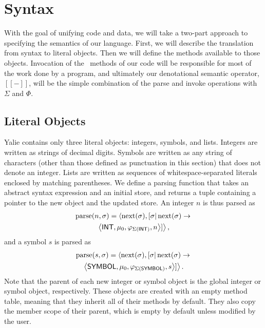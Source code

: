 \documentclass[twocolumn]{article}
\begin{document}
\section*{Syntax}

With the goal of unifying code and data, we will take a two-part
approach to specifying the semantics of our language. First, we will
describe the translation from syntax to literal objects. Then we will
define the methods available to those objects. Invocation of the
\eval\ methods of our code will be responsible for most of the work
done by a program, and ultimately our denotational semantic operator,
$[\![-]\!]$, will be the simple combination of the parse and invoke
operations with $\Sigma$ and $\Phi$.

\subsection*{Literal Objects}
Yalie contains only three literal objects: integers, symbols, and
lists. Integers are written as strings of decimal digits. Symbols are
written as any string of characters (other than those defined as
punctuation in this section) that does not denote an integer. Lists
are written as sequences of whitespace-separated literals enclosed by
matching parentheses. We define a parsing function that takes an
abstract syntax expression and an initial store, and returns a tuple
containing a pointer to the new object and the updated store.  An
integer $n$ is thus parsed as
\begin{multline*}
\operatorname{parse}(n,\sigma) =
\left<\operatorname{next}(\sigma),[\sigma|\operatorname{next}(\sigma) \rightarrow\right. \\
\left.\left<\mathsf{INT}, \mu_0, \varphi_{\Sigma(\mathsf{INT})}, n\right>]\right>,
\end{multline*}
and a symbol $s$ is parsed as
\begin{multline*}
  \operatorname{parse}(s,\sigma) =
  \left<\operatorname{next}(\sigma),[\sigma|\operatorname{next}(\sigma) \rightarrow\right. \\
\left.\left<\mathsf{SYMBOL}, \mu_0, \varphi_{\Sigma(\mathsf{SYMBOL})},
  s\right>]\right>.
\end{multline*}
Note that the parent of each new integer or symbol object is the
global integer or symbol object, respectively. These objects are
created with an empty method table, meaning that they inherit all of
their methods by default. They also copy the member scope of their
parent, which is empty by default unless modified by the user.
\end{document}
